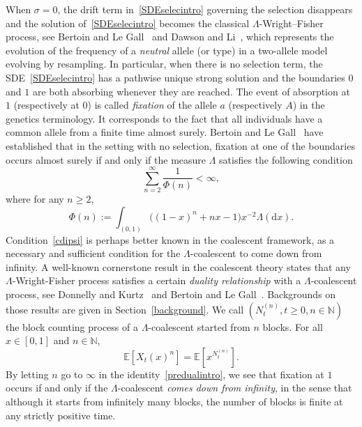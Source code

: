 \documentclass[AHL,Unicode,longabstracts,published]{cedram}
\newcommand{\ddr}{\mathrm{d}}
\newcommand{\bbN}{\mathbb{N}}
\newcommand{\bbE}{\mathbb{E}}
\begin{document}
When $\sigma=0$, the drift term in~\eqref{SDEselecintro} governing the selection disappears and the solution of~\eqref{SDEselecintro} becomes the classical $\Lambda$-Wright--Fisher process, see Bertoin and Le Gall~\cite{LGB2} and Dawson and Li~\cite{DawsonLi}, which represents the evolution of the frequency of a \emph{neutral} allele (or type) in a two-allele model evolving by resampling. In particular, when there is no selection term, the SDE~\eqref{SDEselecintro} has a pathwise unique strong solution and the boundaries $0$ and $1$ are both absorbing whenever they are reached. The event of absorption at $1$ (respectively at $0$) is called \emph{fixation} of the allele $a$ (respectively $A$) in the genetics terminology. It corresponds to the fact that all individuals have a common allele from a finite time almost surely. Bertoin and Le Gall~\cite{LGB2} have established that in the setting with no selection, fixation at one of the boundaries occurs almost surely if and only if the measure $\Lambda$ satisfies the following condition
\begin{equation}\label{cdipsi}
\sum_{n=2}^{\infty}\frac{1}{\Phi(n)}<\infty,
\end{equation}
where for any $n\geq 2$,
\begin{equation}\label{phi2}
\Phi(n):=\int_{(0,1)}\big((1-x)^{n}+nx-1\big)x^{-2}\Lambda(\ddr x).
\end{equation}
Condition~\eqref{cdipsi} is perhaps better known in the coalescent framework, as a necessary and sufficient condition for the $\Lambda$-coalescent to come down from infinity. A well-known cornerstone result in the coalescent theory states that any $\Lambda$-Wright-Fisher process satisfies a certain \emph{duality relationship} with a $\Lambda$-coalescent process, see Donnelly and Kurtz~\cite{DonnKurtz} and Bertoin and Le Gall~\cite{MR1990057}. Backgrounds on those results are given in Section~\ref{background}. We call $(N^{(n)}_t,t\geq 0,n\in \bbN)$ the block counting process of a $\Lambda$-coalescent started from $n$ blocks. For all $x\in [0,1]$ and $n\in \bbN$,
\begin{equation}\label{predualintro}
\bbE\left[X_t(x)^n\right]=\bbE\left[x^{N_t^{(n)}}\right].
\end{equation}
By letting $n$ go to $\infty$ in the identity~\eqref{predualintro}, we see that fixation at $1$ occurs if and only if the $\Lambda$-coalescent \emph{comes down from infinity}, in the sense that although it starts from infinitely many blocks, the number of blocks is finite at any strictly positive time.
\end{document}
